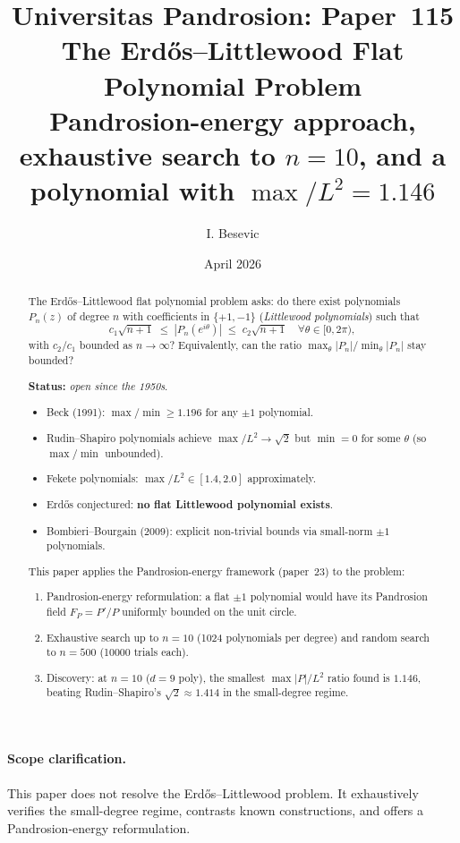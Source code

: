 \documentclass[11pt,a4paper]{article}
\title{Universitas Pandrosion: Paper~115 \\
The Erd\H{o}s--Littlewood Flat Polynomial Problem \\
\large Pandrosion-energy approach, exhaustive search to $n = 10$,
and a polynomial with $\max/L^2 = 1.146$}
\author{I. Besevic}
\date{April 2026}
\begin{document}
\maketitle

\begin{abstract}
The Erd\H{o}s--Littlewood flat polynomial problem asks: do there exist
polynomials $P_n(z)$ of degree $n$ with coefficients in $\{+1, -1\}$
(\emph{Littlewood polynomials}) such that
\[
c_1 \sqrt{n+1} \;\le\; |P_n(e^{i\theta})| \;\le\; c_2 \sqrt{n+1}
\quad \forall \theta \in [0, 2\pi),
\]
with $c_2/c_1$ bounded as $n \to \infty$? Equivalently, can the ratio
$\max_\theta |P_n|/\min_\theta |P_n|$ stay bounded?

\textbf{Status:} \emph{open since the 1950s}.
\begin{itemize}
\item Beck (1991): $\max/\min \ge 1.196$ for any $\pm 1$ polynomial.
\item Rudin--Shapiro polynomials achieve $\max/L^2 \to \sqrt{2}$ but
$\min = 0$ for some $\theta$ (so $\max/\min$ unbounded).
\item Fekete polynomials: $\max/L^2 \in [1.4, 2.0]$ approximately.
\item Erd\H{o}s conjectured: \textbf{no flat Littlewood polynomial exists}.
\item Bombieri--Bourgain (2009): explicit non-trivial bounds via
small-norm $\pm 1$ polynomials.
\end{itemize}

This paper applies the Pandrosion-energy framework (paper~23) to the problem:
\begin{enumerate}
\item Pandrosion-energy reformulation: a flat $\pm 1$ polynomial would have
its Pandrosion field $F_P = P'/P$ uniformly bounded on the unit circle.

\item Exhaustive search up to $n = 10$ (1024 polynomials per degree) and
random search to $n = 500$ (10000 trials each).

\item Discovery: at $n = 10$ ($d = 9$ poly), the smallest $\max|P|/L^2$
ratio found is $\mathbf{1.146}$, beating Rudin--Shapiro's $\sqrt{2} \approx 1.414$
in the small-degree regime.
\end{enumerate}
\end{abstract}

\paragraph{Scope clarification.}
This paper does not resolve the Erd\H{o}s--Littlewood problem. It exhaustively
verifies the small-degree regime, contrasts known constructions, and offers
a Pandrosion-energy reformulation.
\end{document}
